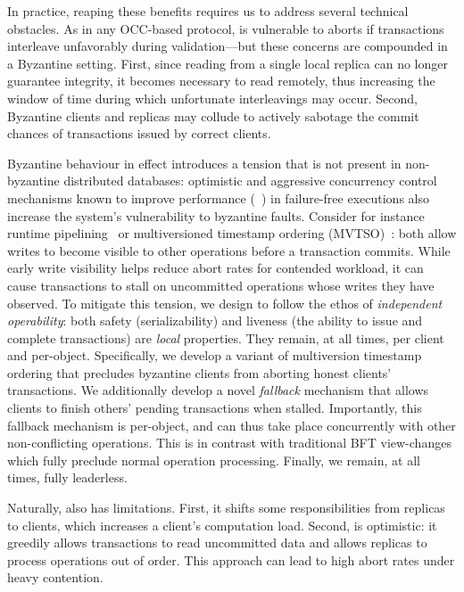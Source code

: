 In practice, reaping these benefits requires us to address several
technical obstacles. As in any OCC-based protocol, \sys
is vulnerable to aborts if transactions interleave unfavorably during
validation---but these concerns are compounded in a Byzantine
setting. First, since reading from a single local replica can no
longer guarantee integrity, it becomes necessary to read remotely,
thus increasing the window of time during which unfortunate
interleavings may occur. Second, Byzantine clients and replicas may
collude to actively sabotage the commit chances of transactions issued
by correct clients. 

Byzantine behaviour in effect introduces a tension that is not present in non-byzantine
distributed databases: optimistic and aggressive concurrency control mechanisms known
to improve performance (~\cite{kung1981occ,bernstein1983mcc,reed1983atomic,xie2015callas,zhang2015tapir}) in failure-free executions also increase the system's vulnerability to byzantine faults. Consider for instance runtime pipelining~\cite{xie2015callas,su2017tebaldi} or multiversioned timestamp ordering (MVTSO)~\cite{bernstein1983mcc,reed1983atomic}: both allow writes to become visible to other operations before a transaction commits. While early write visibility helps reduce abort rates for
contended workload, it can cause transactions to stall on uncommitted operations whose writes they have observed. To mitigate this tension, we design \sys{} to follow the ethos of \textit{independent operability}: both safety (serializability) and liveness (the ability to issue and complete transactions) are \textit{local} properties. They remain, at all times, per client and per-object. Specifically, we develop a variant of multiversion timestamp ordering that precludes byzantine clients from
aborting honest clients' transactions. We additionally develop a novel \textit{fallback} mechanism that allows clients to finish others' pending transactions when stalled. Importantly, this fallback mechanism is per-object, and can thus take place concurrently with other non-conflicting operations. This is in contrast with traditional BFT view-changes which fully preclude normal operation processing.  Finally, we remain, at all times, fully leaderless.

Naturally, \sys{} also has limitations. First, it shifts some
responsibilities from replicas to clients, which increases a client's computation load. Second, \sys{} is optimistic: it greedily allows transactions to read uncommitted data and allows replicas to process operations out of order. This approach can lead to high abort rates under heavy contention.


